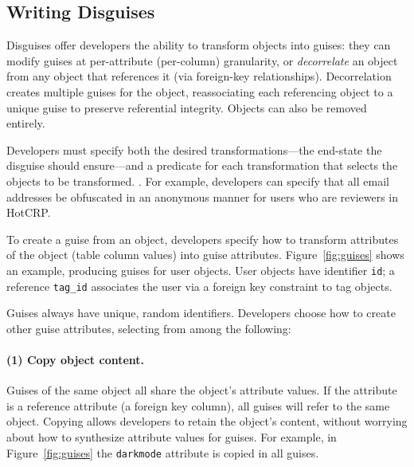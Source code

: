 %
%
%

\subsection{Writing Disguises}
\label{sec:disguises}
Disguises offer developers the ability to transform objects into guises: they can modify guises at
per-attribute (\ie per-column) granularity, or \emph{decorrelate} an object from any object that
references it (via \eg foreign-key relationships). Decorrelation creates multiple guises for the
object, reassociating each referencing object to a unique guise to preserve referential integrity.
Objects can also be removed entirely.  

Developers must specify both the desired
transformations---the end-state the disguise should ensure---and
a predicate for each transformation that selects the objects to be transformed.  
. For example, developers can
specify that all email addresses be obfuscated in an anonymous manner for users who are reviewers in HotCRP. 

To create a guise from an object, developers specify how to transform attributes of the
object (\eg table column values) into guise attributes.
%
Figure~\ref{fig:guises} shows an example, producing guises for user objects.
%
User objects have identifier \texttt{id}; a reference \texttt{tag\_id}
associates the user via a foreign key constraint to tag objects.
%

%
Guises always have unique, random identifiers.
%
Developers choose how to create other guise attributes, selecting from among the following:
%
\paragraph{(1) Copy object content.}
%
Guises of the same object all share the object's attribute values.
%
If the attribute is a reference attribute (\eg a foreign key column), all guises will refer to the same object.
%
%
Copying allows developers to retain the object's content, without worrying about how to
synthesize attribute values for guises.
%
For example, in Figure~\ref{fig:guises} the \texttt{darkmode} attribute is copied in
all guises.

